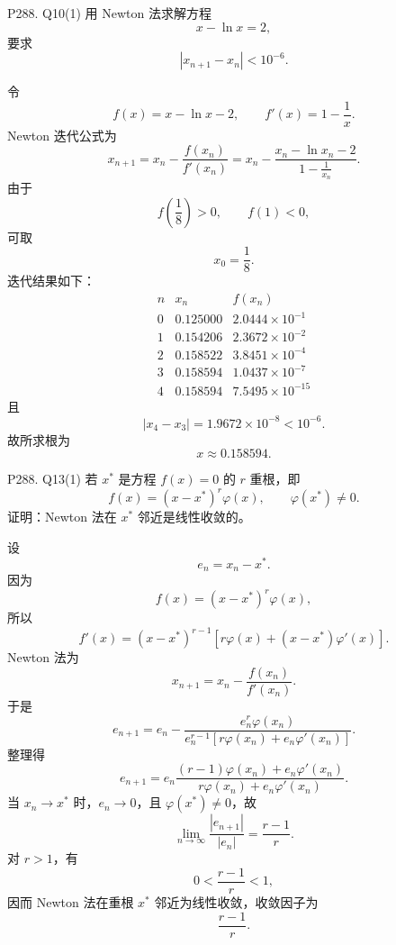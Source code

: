 \documentclass[11pt, a4paper, fontset=none]{ctexart}
\begin{document}
\begin{problem}{P288. Q10(1)}
    用 Newton 法求解方程
    \[
        x-\ln x=2,
    \]
    要求
    \[
        |x_{n+1}-x_n|<10^{-6}.
    \]
\end{problem}

\begin{solution}
    令
    \[
        f(x)=x-\ln x-2,\qquad f'(x)=1-\frac{1}{x}.
    \]
    Newton 迭代公式为
    \[
        x_{n+1}
        =x_n-\frac{f(x_n)}{f'(x_n)}
        =x_n-\frac{x_n-\ln x_n-2}{1-\frac{1}{x_n}}.
    \]
    由于
    \[
        f\left(\frac18\right)>0,\qquad f(1)<0,
    \]
    可取
    \[
        x_0=\frac18.
    \]
    迭代结果如下：
    \[
        \begin{array}{c|cc}
            n & x_n & f(x_n) \\ \hline
            0 & 0.125000 & 2.0444\times 10^{-1} \\
            1 & 0.154206 & 2.3672\times 10^{-2} \\
            2 & 0.158522 & 3.8451\times 10^{-4} \\
            3 & 0.158594 & 1.0437\times 10^{-7} \\
            4 & 0.158594 & 7.5495\times 10^{-15}
        \end{array}
    \]
    且
    \[
        |x_4-x_3|=1.9672\times 10^{-8}<10^{-6}.
    \]
    故所求根为
    \[
        \boxed{x\approx 0.158594}.
    \]
\end{solution}


\begin{problem}{P288. Q13(1)}
    若 $x^\ast$ 是方程 $f(x)=0$ 的 $r$ 重根，即
    \[
        f(x)=(x-x^\ast)^r\varphi(x),\qquad \varphi(x^\ast)\ne 0.
    \]
    证明：Newton 法在 $x^\ast$ 邻近是线性收敛的。
\end{problem}

\begin{myproof}
    设
    \[
        e_n=x_n-x^\ast.
    \]
    因为
    \[
        f(x)= (x-x^\ast)^r\varphi(x),
    \]
    所以
    \[
        f'(x)
        =(x-x^\ast)^{r-1}
        \left[r\varphi(x)+(x-x^\ast)\varphi'(x)\right].
    \]
    Newton 法为
    \[
        x_{n+1}=x_n-\frac{f(x_n)}{f'(x_n)}.
    \]
    于是
    \[
        e_{n+1}
        =e_n-\frac{e_n^r\varphi(x_n)}
        {e_n^{r-1}\left[r\varphi(x_n)+e_n\varphi'(x_n)\right]}.
    \]
    整理得
    \[
        e_{n+1}
        =e_n
        \frac{(r-1)\varphi(x_n)+e_n\varphi'(x_n)}
        {r\varphi(x_n)+e_n\varphi'(x_n)}.
    \]
    当 $x_n\to x^\ast$ 时，$e_n\to 0$，且 $\varphi(x^\ast)\ne 0$，故
    \[
        \lim_{n\to\infty}\frac{|e_{n+1}|}{|e_n|}
        =\frac{r-1}{r}.
    \]
    对 $r>1$，有
    \[
        0<\frac{r-1}{r}<1,
    \]
    因而 Newton 法在重根 $x^\ast$ 邻近为线性收敛，收敛因子为
    \[
        \boxed{\frac{r-1}{r}}.
    \]
\end{myproof}
\end{document}

